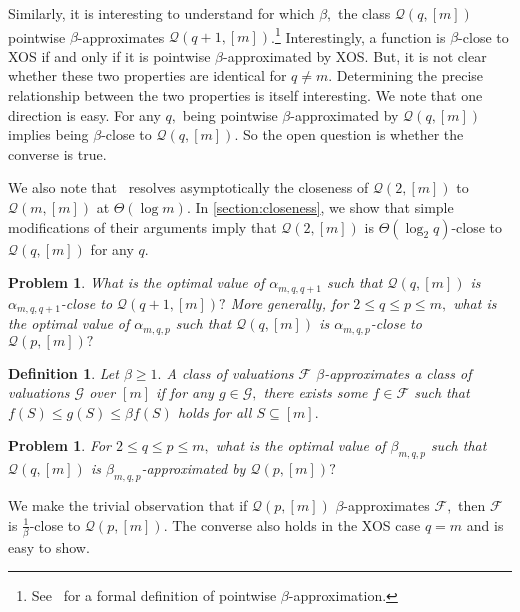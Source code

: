 \documentclass[11pt]{article}%
\newtheorem{definition}[theorem]{Definition}
\newtheorem{problem}[theorem]{Problem}
\numberwithin{theorem}{subsection}
\begin{document}
Similarly, it is interesting to understand for which $\beta,$ the class $\mathcal{Q}(q,[m])$ pointwise $\beta$-approximates $\mathcal{Q}(q+1,[m])$.\footnote{See~\cite{DevanurMSW15} for a formal definition of pointwise $\beta$-approximation.} Interestingly, a function is $\beta$-close to XOS if and only if it is pointwise $\beta$-approximated by XOS. But, it is not clear whether these two properties are identical for $q\neq m.$ Determining the precise relationship between the two properties is itself interesting. We note that one direction is easy. For any $q,$ being pointwise $\beta$-approximated by $\mathcal{Q}(q,[m])$ implies being $\beta$-close to $\mathcal{Q}(q,[m])$. So the open question is whether the converse is true.

We also note that~\cite{BhawalkarR11} resolves asymptotically the closeness of $\mathcal{Q}(2,[m])$ to $\mathcal{Q}(m,[m])$ at $\Theta(\log m)$. In \cref{section:closeness}, we show that simple modifications of their arguments imply that $\mathcal{Q}(2,[m])$ is $\Theta(\log_2 q)$-close to $\mathcal{Q}(q,[m])$ for any $q$.\\

\iffalse 
\begin{problem}
\label{prob:closenessproblem}
What is the optimal value of $\alpha_{m,q,q+1}$ such that $\mathcal{Q}(q,[m])$ is 
$\alpha_{m,q,q+1}$-close to $\mathcal{Q}(q+1, [m])?$ More generally, for $2\le q \le p\le m,$ what is the 
optimal value of $\alpha_{m,q,p}$ such that $\mathcal{Q}(q,[m])$ is 
$\alpha_{m,q,p}$-close to $\mathcal{Q}(p, [m])?$
\end{problem}




\begin{definition}
\label{def:defofapproximation}
Let $\beta\ge 1.$
A class of valuations $\mathcal{F}$ $\beta$-approximates a class of valuations $\mathcal{G}$ over $[m]$ if for any $g\in \mathcal{G},$ there exists some $f\in \mathcal{F}$ such that 
$f(S)\le g(S)\le \beta f(S)$ holds for all $S\subseteq [m].$
\end{definition}



\begin{problem}
\label{prob:approximationproblem}
For $2\le q \le p\le m,$ what is the 
optimal value of $\beta_{m,q,p}$ such that $\mathcal{Q}(q,[m])$ is 
$\beta_{m,q,p}$-approximated by $\mathcal{Q}(p, [m])?$
\end{problem}

We make the trivial observation that if $\mathcal{Q}(p,[m])$ $\beta$-approximates $\mathcal{F},$ then 
$\mathcal{F}$ is $\frac{1}{\beta}$-close to $\mathcal{Q}(p,[m]).$ The converse also holds in the XOS case $q = m$ and is easy to show. 
\end{document}

